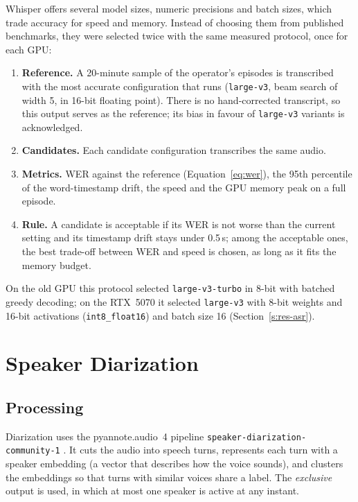 Whisper offers several model sizes, numeric precisions and batch sizes, which trade accuracy for speed and memory. Instead of choosing them from published benchmarks, they were selected twice with the same measured protocol, once for each GPU:
\begin{enumerate}
\item \textbf{Reference.} A 20-minute sample of the operator's episodes is transcribed with the most accurate configuration that runs (\texttt{large-v3}, beam search of width 5, in 16-bit floating point). There is no hand-corrected transcript, so this output serves as the reference; its bias in favour of \texttt{large-v3} variants is acknowledged.
\item \textbf{Candidates.} Each candidate configuration transcribes the same audio.
\item \textbf{Metrics.} WER against the reference (Equation~\ref{eq:wer}), the 95th percentile of the word-timestamp drift, the speed and the GPU memory peak on a full episode.
\item \textbf{Rule.} A candidate is acceptable if its WER is not worse than the current setting and its timestamp drift stays under 0.5\,s; among the acceptable ones, the best trade-off between WER and speed is chosen, as long as it fits the memory budget.
\end{enumerate}
On the old GPU this protocol selected \texttt{large-v3-turbo} in 8-bit with batched greedy decoding; on the RTX~5070 it selected \texttt{large-v3} with 8-bit weights and 16-bit activations (\texttt{int8\_float16}) and batch size 16 (Section~\ref{s:res-asr}).

\section{Speaker Diarization}

\subsection*{Processing}

Diarization uses the pyannote.audio~4 pipeline \texttt{speaker-diarization-community-1} \cite{bredin2020pyannote}. It cuts the audio into speech turns, represents each turn with a speaker embedding (a vector that describes how the voice sounds), and clusters the embeddings so that turns with similar voices share a label. The \textit{exclusive} output is used, in which at most one speaker is active at any instant.

